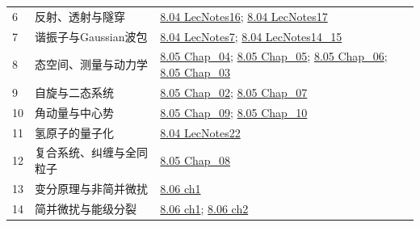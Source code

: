 \begin{longtable}{p{}p{}p{}}
6 & 反射、透射与隧穿 & \href{https://ocw.mit.edu/courses/8-04-quantum-physics-i-spring-2016/resources/mit8_04s16_lecnotes16/}{8.04 LecNotes16}; \href{https://ocw.mit.edu/courses/8-04-quantum-physics-i-spring-2016/resources/mit8_04s16_lecnotes17/}{8.04 LecNotes17}\\
7 & 谐振子与Gaussian波包 & \href{https://ocw.mit.edu/courses/8-04-quantum-physics-i-spring-2016/resources/mit8_04s16_lecnotes7/}{8.04 LecNotes7}; \href{https://ocw.mit.edu/courses/8-04-quantum-physics-i-spring-2016/resources/mit8_04s16_lecnotes14_15/}{8.04 LecNotes14\_15}\\
8 & 态空间、测量与动力学 & \href{https://ocw.mit.edu/courses/8-05-quantum-physics-ii-fall-2013/resources/lecture-notes-4/}{8.05 Chap\_04}; \href{https://ocw.mit.edu/courses/8-05-quantum-physics-ii-fall-2013/resources/lecture-notes-5/}{8.05 Chap\_05}; \href{https://ocw.mit.edu/courses/8-05-quantum-physics-ii-fall-2013/resources/lecture-notes-6/}{8.05 Chap\_06}; \href{https://ocw.mit.edu/courses/8-05-quantum-physics-ii-fall-2013/resources/lecture-notes-3/}{8.05 Chap\_03}\\
9 & 自旋与二态系统 & \href{https://ocw.mit.edu/courses/8-05-quantum-physics-ii-fall-2013/resources/lecture-notes-2/}{8.05 Chap\_02}; \href{https://ocw.mit.edu/courses/8-05-quantum-physics-ii-fall-2013/resources/lecture-notes-7/}{8.05 Chap\_07}\\
10 & 角动量与中心势 & \href{https://ocw.mit.edu/courses/8-05-quantum-physics-ii-fall-2013/resources/lecture-notes-9/}{8.05 Chap\_09}; \href{https://ocw.mit.edu/courses/8-05-quantum-physics-ii-fall-2013/resources/lecture-notes-10/}{8.05 Chap\_10}\\
11 & 氢原子的量子化 & \href{https://ocw.mit.edu/courses/8-04-quantum-physics-i-spring-2016/resources/mit8_04s16_lecnotes22/}{8.04 LecNotes22}\\
12 & 复合系统、纠缠与全同粒子 & \href{https://ocw.mit.edu/courses/8-05-quantum-physics-ii-fall-2013/resources/lecture-notes-8/}{8.05 Chap\_08}\\
13 & 变分原理与非简并微扰 & \href{https://ocw.mit.edu/courses/8-06-quantum-physics-iii-spring-2018/resources/chapter-1-non-degenerate-and-degenerate-perturbation-theory/}{8.06 ch1}\\
14 & 简并微扰与能级分裂 & \href{https://ocw.mit.edu/courses/8-06-quantum-physics-iii-spring-2018/resources/chapter-1-non-degenerate-and-degenerate-perturbation-theory/}{8.06 ch1}; \href{https://ocw.mit.edu/courses/8-06-quantum-physics-iii-spring-2018/resources/chapter-2-hydrogen-fine-structure/}{8.06 ch2}\\

\end{longtable}
